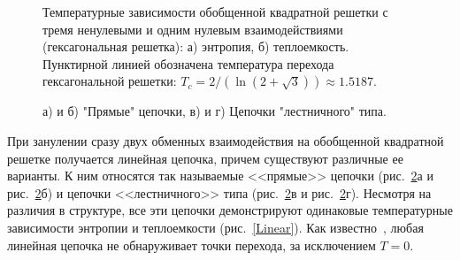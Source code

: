 \begin{figure}[h]
	\begin{minipage}[h]{0.5\linewidth}
	\end{minipage}
	\hfill
	\begin{minipage}[h]{0.5\linewidth}
	\end{minipage}
	\caption{Температурные зависимости обобщенной квадратной решетки с тремя ненулевыми и одним нулевым взаимодействиями (гексагональная решетка): а) энтропия, б) теплоемкость. Пунктирной линией обозначена температура перехода гексагональной решетки: $T_c = 2/(\ln(2+\sqrt{3}))\approx 1.5187$.}
	\label{Hex}
\end{figure}

\begin{figure}[h]
	\begin{minipage}{0.45\linewidth}
	\end{minipage}
	\hfill
	\begin{minipage}{0.45\linewidth}
	\end{minipage}
	\vfill
	\begin{minipage}{0.45\linewidth}
	\end{minipage}
	\hfill
	\begin{minipage}{0.45\linewidth}
	\end{minipage}
	\caption{а) и б) "Прямые" цепочки, в) и г) Цепочки "лестничного" типа.}
	\label{linearChains}
\end{figure}

При занулении сразу двух обменных взаимодействия на обобщенной квадратной решетке получается линейная цепочка, причем существуют различные ее варианты. К ним относятся так называемые <<прямые>> цепочки (рис.~\ref{linearChains}а и рис.~\ref{linearChains}б) и цепочки <<лестничного>> типа (рис.~\ref{linearChains}в и рис.~\ref{linearChains}г). Несмотря на различия в структуре, все эти цепочки демонстрируют одинаковые температурные зависимости энтропии и теплоемкости (рис.~\ref{Linear}). Как известно~\cite{mussardo2010}, любая линейная цепочка не обнаруживает точки перехода, за исключением $T=0$.

